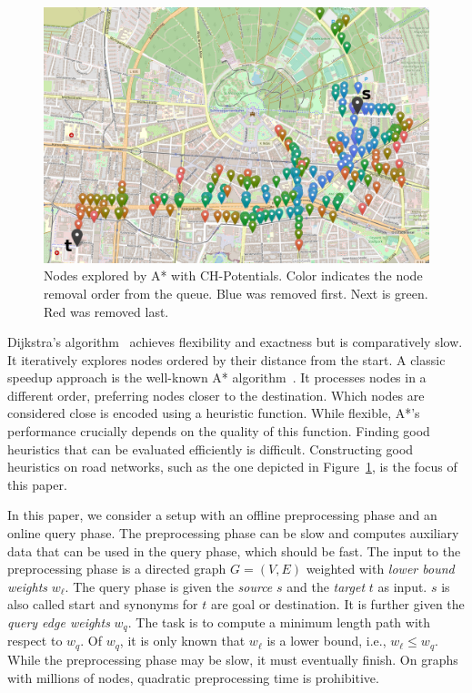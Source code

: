 \documentclass[letterpaper]{article} %
\begin{document}
\begin{figure}

\centering
\includegraphics[width=\columnwidth]{fig/searchspace_st.png}


\caption{Nodes explored by A* with CH-Potentials. Color indicates the node removal order from the queue. Blue was removed first. Next is green. Red was removed last.}
\label{img:search-space}
\end{figure}


Dijkstra's algorithm~\cite{d-ntpcg-59} achieves flexibility and exactness but is comparatively slow.
It iteratively explores nodes ordered by their distance from the start.
A classic speedup approach is the well-known A* algorithm~\cite{hnr-afbhd-68}.
It processes nodes in a different order, preferring nodes closer to the destination.
Which nodes are considered close is encoded using a heuristic function.
While flexible, A*'s performance crucially depends on the quality of this function.
Finding good heuristics that can be evaluated efficiently is difficult.
Constructing good heuristics on road networks, such as the one depicted in Figure~\ref{img:search-space}, is the focus of this paper.

In this paper, we consider a setup with an offline preprocessing phase and an online query phase.
The preprocessing phase can be slow and computes auxiliary data that can be used in the query phase, which should be fast.
The input to the preprocessing phase is a directed graph $G=(V,E)$ weighted with \emph{lower bound weights} $w_\ell$.
The query phase is given the \emph{source} $s$ and the \emph{target} $t$ as input.
$s$ is also called start and synonyms for $t$ are goal or destination.
It is further given the \emph{query edge weights} $w_q$.
The task is to compute a minimum length path with respect to $w_q$.
Of $w_q$, it is only known that $w_\ell$ is a lower bound, i.e., $w_\ell \le w_q$.
%
While the preprocessing phase may be slow, it must eventually finish.
On graphs with millions of nodes, quadratic preprocessing time is prohibitive.
\end{document}
